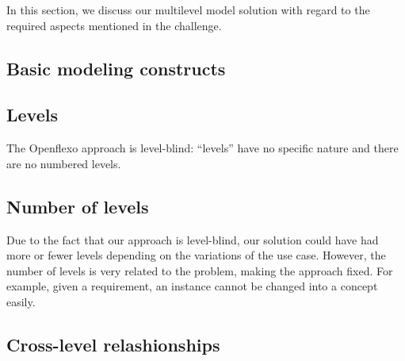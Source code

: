 In this section, we discuss our multilevel model solution with regard to the required aspects 
mentioned in the challenge.


  \subsection{Basic modeling constructs}


  \subsection{Levels}


  The Openflexo approach is level-blind: ``levels'' have no specific
  nature and there are no numbered levels. 

  \subsection{Number of levels}

  Due to the fact that our approach is level-blind, our solution could have had more
  or fewer levels depending on the variations of the use case. However, the number of levels is very related to the problem, making the approach fixed. For example, given a requirement, an instance cannot be changed into a concept easily.

  \subsection{Cross-level relashionships}

